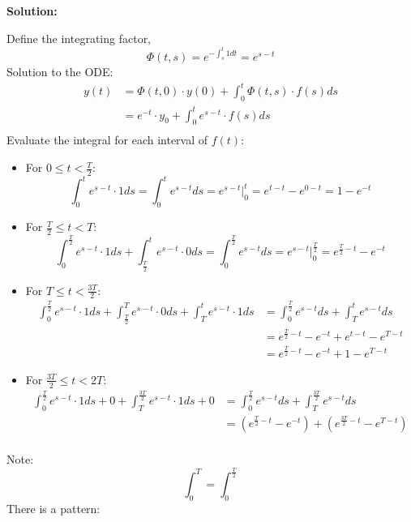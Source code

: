 \documentclass[12pt]{article}
\newenvironment{solution}{
    \textbf{Solution:}
    
}{
    
    \vspace{2em}
}
\begin{document}
\begin{solution}
    Define the integrating factor,
    \[
        \Phi(t, s) = e^{-\int_s^t 1 dt} = e^{s-t}
    \]
    Solution to the ODE:
    \[
        \begin{aligned}
            y(t) &= \Phi(t, 0) \cdot y(0) + \int_0^t \Phi(t, s) \cdot f(s) ds \\
            &= e^{-t} \cdot y_0 + \int_0^t e^{s-t} \cdot f(s) ds \\
        \end{aligned}
    \]
    Evaluate the integral for each interval of \(f(t)\):
    \begin{itemize}
        \item For \(0 \leq t < \frac{T}{2}\):
        \[
            \int_0^t e^{s-t} \cdot 1 ds = \int_0^t e^{s-t} ds = e^{s-t} \bigg|_{0}^{t} = e^{t-t} - e^{0-t} = 1 - e^{-t}
        \]
        \item For \(\frac{T}{2} \leq t < T\):
        \[
            \int_0^\frac{T}{2} e^{s-t} \cdot 1 ds + \int_\frac{T}{2}^t e^{s-t} \cdot 0 ds = \int_0^\frac{T}{2} e^{s-t} ds = e^{s-t} \bigg|_{0}^{\frac{T}{2}} = e^{\frac{T}{2}-t} - e^{-t}
        \]
        \item For \(T \leq t < \frac{3T}{2}\):
        \[
            \begin{aligned}
                \int_0^\frac{T}{2} e^{s-t} \cdot 1 ds + \int_\frac{T}{2}^T e^{s-t} \cdot 0 ds + \int_T^t e^{s-t} \cdot 1 ds &= \int_0^\frac{T}{2} e^{s-t} ds + \int_T^t e^{s-t} ds \\
                &= e^{\frac{T}{2}-t} - e^{-t} + e^{t-t} - e^{T-t} \\
                &= e^{\frac{T}{2}-t} - e^{-t} + 1 - e^{T-t}
            \end{aligned}
        \]
        \item For \(\frac{3T}{2} \leq t < 2T\):
        \[
            \begin{aligned}
                \int_0^\frac{T}{2} e^{s-t} \cdot 1 ds + 0 + \int_{T}^\frac{3T}{2} e^{s-t} \cdot 1 ds + 0  &= \int_0^\frac{T}{2} e^{s-t} ds + \int_{T}^\frac{3T}{2} e^{s-t} ds \\
                &= (e^{\frac{T}{2}-t} - e^{-t}) + (e^{\frac{3T}{2}-t} - e^{T-t}) \\
            \end{aligned}
        \]
    \end{itemize}
    Note:
    \[
        \int_0^T = \int_{0}^{\frac{T}{2}}
    \]
    There is a pattern:
    \[
        \begin{aligned}

\end{aligned}\]
\end{solution}
\end{document}
